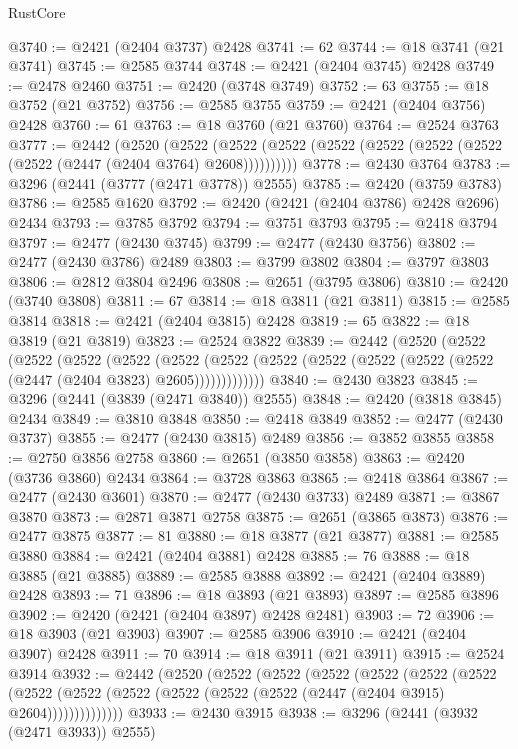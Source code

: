 \begin{lexlean}{RustCore}
\begin{coremodule}
@3740 := @2421 (@2404 @3737) @2428
@3741 := 62
@3744 := @18 @3741 (@21 @3741)
@3745 := @2585 @3744
@3748 := @2421 (@2404 @3745) @2428
@3749 := @2478 @2460
@3751 := @2420 (@3748 @3749)
@3752 := 63
@3755 := @18 @3752 (@21 @3752)
@3756 := @2585 @3755
@3759 := @2421 (@2404 @3756) @2428
@3760 := 61
@3763 := @18 @3760 (@21 @3760)
@3764 := @2524 @3763
@3777 := @2442
    (@2520
      (@2522 (@2522 (@2522 (@2522 (@2522 (@2522 (@2522 (@2522 (@2447 (@2404 @3764) @2608))))))))))
@3778 := @2430 @3764
@3783 := @3296 (@2441 (@3777 (@2471 @3778)) @2555)
@3785 := @2420 (@3759 @3783)
@3786 := @2585 @1620
@3792 := @2420 (@2421 (@2404 @3786) @2428 @2696) @2434
@3793 := @3785 @3792
@3794 := @3751 @3793
@3795 := @2418 @3794
@3797 := @2477 (@2430 @3745)
@3799 := @2477 (@2430 @3756)
@3802 := @2477 (@2430 @3786) @2489
@3803 := @3799 @3802
@3804 := @3797 @3803
@3806 := @2812 @3804 @2496
@3808 := @2651 (@3795 @3806)
@3810 := @2420 (@3740 @3808)
@3811 := 67
@3814 := @18 @3811 (@21 @3811)
@3815 := @2585 @3814
@3818 := @2421 (@2404 @3815) @2428
@3819 := 65
@3822 := @18 @3819 (@21 @3819)
@3823 := @2524 @3822
@3839 := @2442
    (@2520
      (@2522
        (@2522
          (@2522
            (@2522
              (@2522
                (@2522 (@2522 (@2522 (@2522 (@2522 (@2522 (@2447 (@2404 @3823) @2605)))))))))))))
@3840 := @2430 @3823
@3845 := @3296 (@2441 (@3839 (@2471 @3840)) @2555)
@3848 := @2420 (@3818 @3845) @2434
@3849 := @3810 @3848
@3850 := @2418 @3849
@3852 := @2477 (@2430 @3737)
@3855 := @2477 (@2430 @3815) @2489
@3856 := @3852 @3855
@3858 := @2750 @3856 @2758
@3860 := @2651 (@3850 @3858)
@3863 := @2420 (@3736 @3860) @2434
@3864 := @3728 @3863
@3865 := @2418 @3864
@3867 := @2477 (@2430 @3601)
@3870 := @2477 (@2430 @3733) @2489
@3871 := @3867 @3870
@3873 := @2871 @3871 @2758
@3875 := @2651 (@3865 @3873)
@3876 := @2477 @3875
@3877 := 81
@3880 := @18 @3877 (@21 @3877)
@3881 := @2585 @3880
@3884 := @2421 (@2404 @3881) @2428
@3885 := 76
@3888 := @18 @3885 (@21 @3885)
@3889 := @2585 @3888
@3892 := @2421 (@2404 @3889) @2428
@3893 := 71
@3896 := @18 @3893 (@21 @3893)
@3897 := @2585 @3896
@3902 := @2420 (@2421 (@2404 @3897) @2428 @2481)
@3903 := 72
@3906 := @18 @3903 (@21 @3903)
@3907 := @2585 @3906
@3910 := @2421 (@2404 @3907) @2428
@3911 := 70
@3914 := @18 @3911 (@21 @3911)
@3915 := @2524 @3914
@3932 := @2442
    (@2520
      (@2522
        (@2522
          (@2522
            (@2522
              (@2522
                (@2522
                  (@2522 (@2522 (@2522 (@2522 (@2522 (@2522 (@2447 (@2404 @3915) @2604))))))))))))))
@3933 := @2430 @3915
@3938 := @3296 (@2441 (@3932 (@2471 @3933)) @2555)

\end{coremodule}
\end{lexlean}
